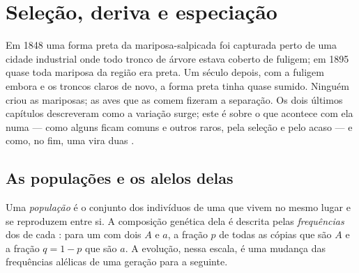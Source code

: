 \chapter{Seleção, deriva e especiação}\label{ch:g12:selection-drift-speciation}

Em 1848 uma forma preta da mariposa-salpicada foi capturada perto de
uma cidade industrial onde todo tronco de árvore estava coberto de
fuligem; em 1895 quase toda mariposa da região era preta. Um século
depois, com a fuligem embora e os troncos claros de novo, a forma preta
tinha quase sumido. Ninguém criou as mariposas; as aves que as comem
fizeram a separação. Os dois últimos capítulos descreveram como a
variação surge; este é sobre o que acontece com ela numa  ---
como alguns  ficam comuns e outros raros, pela seleção e pelo
acaso --- e como, no fim, uma  vira duas .

\section{As populações e os alelos delas}

\begin{definition}\label{def:g12:selection-drift-speciation:population}
Uma \emph{população} é o conjunto dos indivíduos de
uma  que vivem no mesmo lugar e se reproduzem entre si. A
composição genética dela é descrita pelas
\emph{frequências} dos  de cada :
para um  com dois  $A$ e $a$, a fração $p$ de todas as cópias
que são $A$ e a fração $q = 1 - p$ que são $a$. A evolução, nessa
escala, é uma mudança das frequências alélicas de uma geração para a seguinte.
\end{definition}

